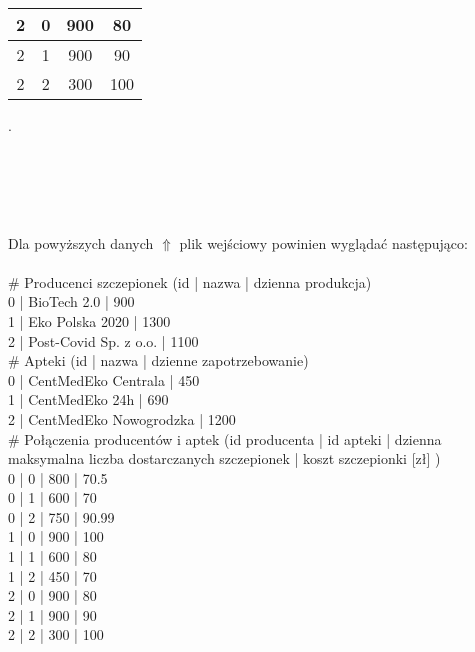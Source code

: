 \documentclass[]{article}
\begin{document}
\begin{table}[h!]
{\begin{tabular}{|c|c|c|c|}
		2                      & 0                                          & 900                                                          & 80                                  \\ \hline
		2                      & 1                                          & 900                                                          & 90                                  \\ \hline
		2                      & 2                                          & 300                                                          & 100                                 \\ \hline
	\end{tabular}
	}
\end{table}
.\\\\\\\\\\\\
 Dla powyższych danych $\Uparrow$  plik wejściowy powinien wyglądać następująco:\\\\
\# Producenci szczepionek (id | nazwa | dzienna produkcja)\\
0 | BioTech 2.0 | 900\\
1 | Eko Polska 2020 | 1300\\
2 | Post-Covid Sp. z o.o. | 1100\\
\# Apteki (id | nazwa | dzienne zapotrzebowanie)\\
0 | CentMedEko Centrala | 450\\
1 | CentMedEko 24h | 690\\
2 | CentMedEko Nowogrodzka | 1200\\
\# Połączenia producentów i aptek (id producenta | id apteki | dzienna maksymalna liczba dostarczanych szczepionek | koszt szczepionki [zł] )\\
0 | 0 | 800 | 70.5\\
0 | 1 | 600 | 70\\
0 | 2 | 750 | 90.99\\
1 | 0 | 900 | 100\\
1 | 1 | 600 | 80\\
1 | 2 | 450 | 70\\
2 | 0 | 900 | 80\\
2 | 1 | 900 | 90\\
2 | 2 | 300 | 100\\
\end{document}
